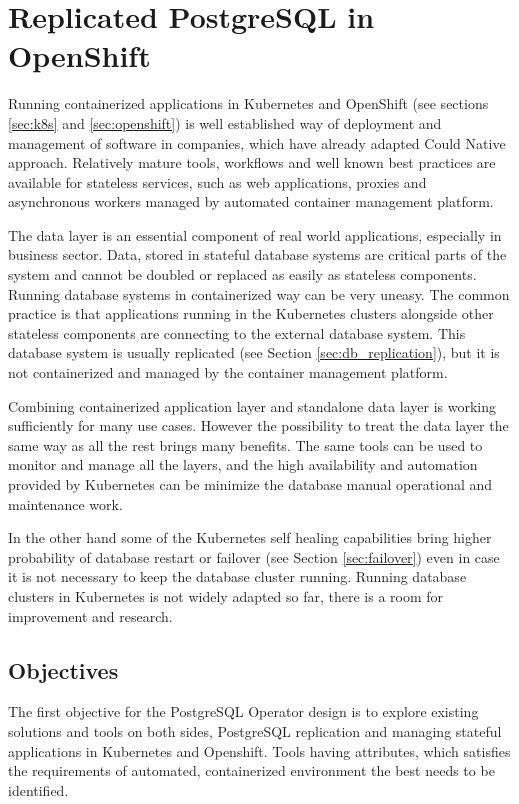 \documentclass[
  digital, %
  twoside, %
  table,   %
  lof,     %
  lot,     %
]{fithesis3}
\begin{document}
\chapter{Replicated PostgreSQL in OpenShift} \label{chap:pg_in_openshift}
Running containerized applications in Kubernetes and OpenShift (see sections \ref{sec:k8s} and \ref{sec:openshift}) is well established way of deployment and management of software in companies, which have already adapted Could Native approach. Relatively mature tools, workflows and well known best practices are available for stateless services, such as web applications, proxies and asynchronous workers managed by automated container management platform.

The data layer is an essential component of real world applications, especially in business sector. Data, stored in stateful database systems are critical parts of the system and cannot be doubled or replaced as easily as stateless components. Running database systems in containerized way can be very uneasy. The common practice is that applications running in the Kubernetes clusters alongside other stateless components are connecting to the external database system. This database system is usually replicated (see Section \ref{sec:db_replication}), but it is not containerized and managed by the container management platform.

Combining containerized application layer and standalone data layer is working sufficiently for many use cases. However the possibility to treat the data layer the same way as all the rest brings many benefits. The same tools can be used to monitor and manage all the layers, and the high availability and automation provided by Kubernetes can be minimize the database manual operational and maintenance work.

In the other hand some of the Kubernetes self healing capabilities bring higher probability of database restart or failover (see Section \ref{sec:failover}) even in case it is not necessary to keep the database cluster running. Running database clusters in Kubernetes is not widely adapted so far, there is a room for improvement and research.

\section{Objectives}
The first objective for the PostgreSQL Operator design is to explore existing solutions and tools on both sides, PostgreSQL replication and managing stateful applications in Kubernetes and Openshift. Tools having attributes, which satisfies the requirements of automated, containerized environment the best needs to be identified.
\end{document}
